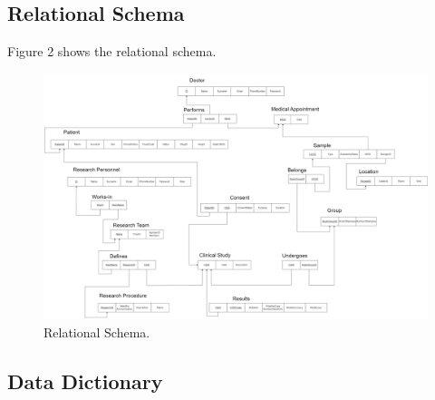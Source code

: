 \subsection{Relational Schema}
Figure 2 shows the relational schema.
\begin{center}
\begin{figure}[htp!]
    \centering
    \includegraphics[width=\textwidth]{src/schemas/RelationalSchema.png}
    \caption{Relational Schema.}
\end{figure}
\end{center}

\newpage
\subsection{Data Dictionary}



